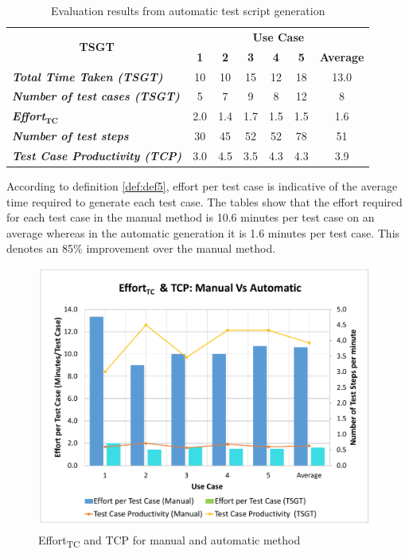 \begin{table}[htbp]
  \centering
  \caption{Evaluation results from automatic test script generation}
  	\begin{adjustbox}{width=1\textwidth}
    \begin{tabular}{|l|c|c|c|c|c|c|}
    \toprule
    \multicolumn{1}{|c|}{\multirow{2}[4]{*}{\textbf{TSGT}}} & \multicolumn{6}{c|}{\textbf{Use Case }} \\
\cmidrule{2-7}          & \textbf{1} & \textbf{2} & \textbf{3} & \textbf{4} & \textbf{5} & \textbf{Average} \\
    \midrule
    \textit{\textbf{Total Time Taken (TSGT)}} & 10    & 10    & 15    & 12    & 18    & 13.0 \\
    \midrule
    \textit{\textbf{Number of test cases (TSGT)}} & 5     & 7     & 9     & 8     & 12    & 8 \\
    \midrule
    \textit{\textbf{Effort$ _{\textbf{TC}}$}} & 2.0   & 1.4   & 1.7   & 1.5   & 1.5   & 1.6 \\
    \midrule
    \textit{\textbf{Number of test steps}} & 30    & 45    & 52    & 52    & 78    & 51 \\
    \midrule
    \textit{\textbf{Test Case Productivity (TCP)}} & 3.0   & 4.5   & 3.5   & 4.3   & 4.3   & 3.9 \\
    \bottomrule
    \end{tabular}%
    \end{adjustbox}
  \label{tab:toolresults}%
\end{table}%


According to definition \ref{def:def5}, effort per test case is indicative of the average time required to generate each test case. The tables show that the effort required for each test case in the manual method is 10.6 minutes per test case on an average whereas in the automatic generation it is 1.6 minutes per test case. This denotes an 85\% improvement over the manual method.

\begin{figure}[htb!]
\centering
\includegraphics[scale=0.45]{content/images/Chapter6/figure2.pdf}
\caption{Effort\textsubscript{TC} and TCP for manual and automatic method}
\label{fig:chap6fig2}
\end{figure}

